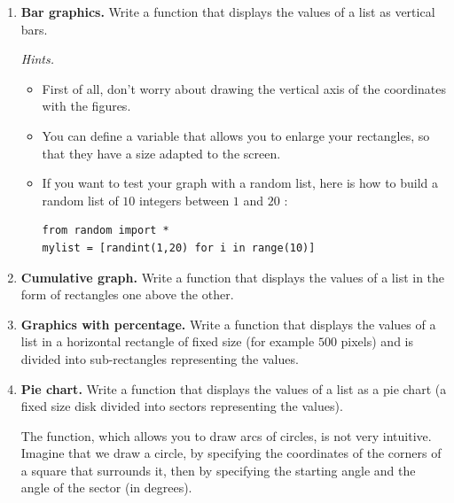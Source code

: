 \documentclass[11pt,class=report,crop=false]{standalone}
\begin{document}
\begin{activite}[Graphics]
\begin{enumerate}
  \item \textbf{Bar graphics.} Write a  function that displays the values of a list as vertical bars.
  


 \emph{Hints.}
  \begin{itemize}
    \item First of all, don't worry about drawing the vertical axis of the coordinates with the figures.
    \item You can define a variable  that allows you to enlarge your rectangles, so that they have a size adapted to the screen.
    \item If you want to test your graph with a random list, here is how to build a random list of $10$ integers between $1$ and $20$ :
    
\begin{lstlisting}
from random import *
mylist = [randint(1,20) for i in range(10)]
\end{lstlisting}

\end{itemize}

  \item \textbf{Cumulative graph.} Write a  function that displays the values of a list in the form of rectangles one above the other.
  

  
  \item \textbf{Graphics with percentage.} Write a  function that displays the values of a list in a horizontal rectangle of fixed size (for example $500$ pixels) and is divided into sub-rectangles representing the values.
  


  \item \textbf{Pie chart.} Write a  function that displays the values of a list as a pie chart (a fixed size disk divided into sectors representing the values). 
 
The   function, which allows you to draw arcs of circles, is not very intuitive. Imagine that we draw a circle, by specifying the coordinates of the corners of a square that surrounds it, then by specifying the starting angle and the angle of the sector (in degrees). 




\end{enumerate}
\end{activite}
\end{document}
